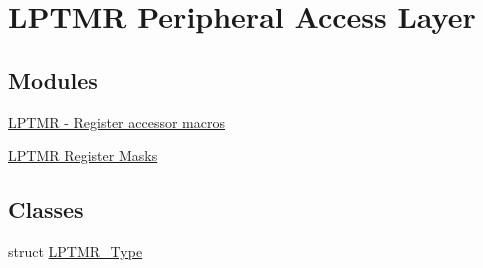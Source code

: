 \hypertarget{group__LPTMR__Peripheral__Access__Layer}{}\section{L\+P\+T\+MR Peripheral Access Layer}
\label{group__LPTMR__Peripheral__Access__Layer}
\subsection*{Modules}
\begin{DoxyCompactItemize}
\item 
\hyperlink{group__LPTMR__Register__Accessor__Macros}{L\+P\+T\+M\+R -\/ Register accessor macros}
\item 
\hyperlink{group__LPTMR__Register__Masks}{L\+P\+T\+M\+R Register Masks}
\end{DoxyCompactItemize}
\subsection*{Classes}
\begin{DoxyCompactItemize}
\item 
struct \hyperlink{structLPTMR__Type}{L\+P\+T\+M\+R\+\_\+\+Type}
\end{DoxyCompactItemize}
